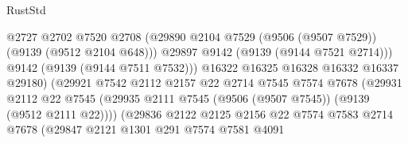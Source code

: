 \begin{lexlean}{RustStd}
\begin{coremodule}
                                          @2727
                                          @2702
                                          @7520
                                          @2708
                                          (@29890
                                            @2104
                                            @7529
                                            (@9506 (@9507 @7529))
                                            (@9139 (@9512 @2104 @648)))
                                          @29897
                                          @9142
                                          (@9139 (@9144 @7521 @2714)))
                                        @9142
                                        (@9139 (@9144 @7511 @7532)))
                                      @16322
                                      @16325
                                      @16328
                                      @16332
                                      @16337
                                      @29180)
                                    (@29921
                                      @7542
                                      @2112
                                      @2157
                                      @22
                                      @2714
                                      @7545
                                      @7574
                                      @7678
                                      (@29931
                                        @2112
                                        @22
                                        @7545
                                        (@29935
                                          @2111
                                          @7545
                                          (@9506 (@9507 @7545))
                                          (@9139 (@9512 @2111 @22))))
                                      (@29836
                                        @2122
                                        @2125
                                        @2156
                                        @22
                                        @7574
                                        @7583
                                        @2714
                                        @7678
                                        (@29847
                                          @2121
                                          @1301
                                          @291
                                          @7574
                                          @7581
                                          @4091

\end{coremodule}
\end{lexlean}
